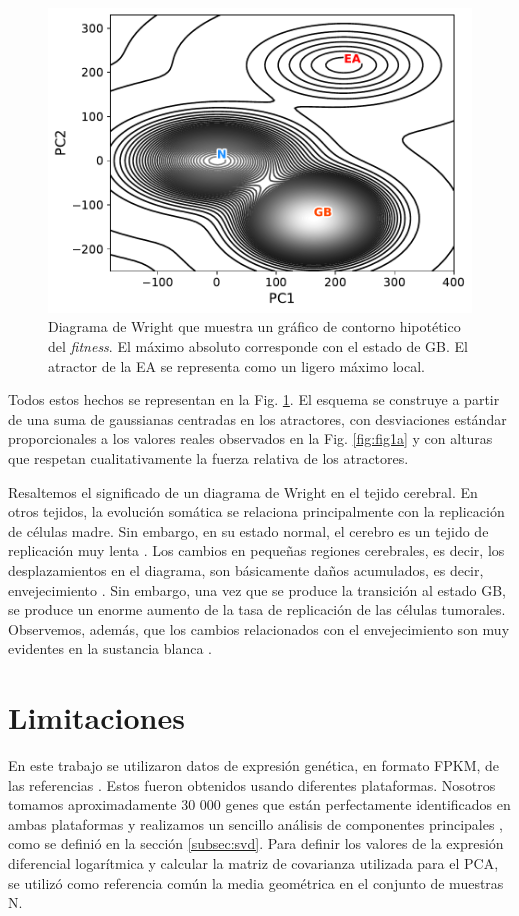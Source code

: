 \begin{figure}[!htb]
	\centering
	\includegraphics[width=0.75\linewidth]{figures/Fig_1c.pdf}
	\caption{Diagrama de Wright que muestra un gráfico de contorno hipotético del \emph{fitness}. El máximo absoluto corresponde con el estado de GB. El atractor de la EA se representa como un ligero máximo local.}
	\label{fig:fig1c}
\end{figure}

Todos estos hechos se representan en la Fig. \ref{fig:fig1c}. El esquema se construye a partir de una suma de gaussianas centradas en los atractores, con desviaciones estándar proporcionales a los valores reales observados en la Fig. \ref{fig:fig1a} y con alturas que respetan cualitativamente la fuerza relativa de los atractores.

Resaltemos el significado de un diagrama de Wright en el tejido cerebral. En otros tejidos, la evolución somática se relaciona principalmente con la replicación de células madre. Sin embargo, en su estado normal, el cerebro es un tejido de replicación muy lenta \cite{spalding2005retrospective}. Los cambios en pequeñas regiones cerebrales, es decir, los desplazamientos en el diagrama, son básicamente daños acumulados, es decir, envejecimiento \cite{schumacher2021central}. Sin embargo, una vez que se produce la transición al estado GB, se produce un enorme aumento de la tasa de replicación de las células tumorales. Observemos, además, que los cambios relacionados con el envejecimiento son muy evidentes en la sustancia blanca \cite{guttmann1998white}.


\section{Limitaciones}\label{sec:limitations}

En este trabajo se utilizaron datos de expresión genética, en formato FPKM, de las referencias \cite{Brennan_2013, Miller_2017}. Estos fueron obtenidos usando diferentes plataformas. Nosotros tomamos aproximadamente 30 000 genes que están perfectamente identificados en ambas plataformas y realizamos un sencillo análisis de componentes principales \cite{Lever2017}, como se definió en la sección \ref{subsec:svd}. Para definir los valores de la expresión diferencial logarítmica y calcular la matriz de covarianza utilizada para el PCA, se utilizó como referencia común la media geométrica en el conjunto de muestras N.

